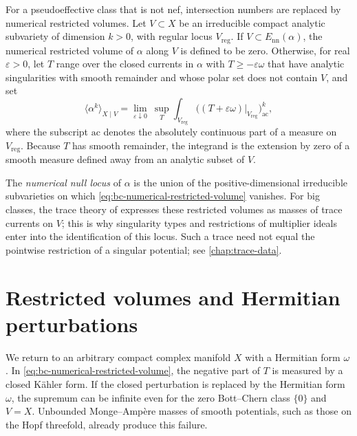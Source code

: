 For a pseudoeffective class that is not nef, intersection numbers are replaced by numerical restricted volumes. Let $V\subset X$ be an irreducible compact analytic subvariety of dimension $k>0$, with regular locus $V_{\mathrm{reg}}$. If $V\subset E_{\mathrm{nn}}(\alpha)$, the numerical restricted volume of $\alpha$ along $V$ is defined to be zero. Otherwise, for real $\varepsilon>0$, let $T$ range over the closed currents in $\alpha$ with $T\geq-\varepsilon\omega$ that have analytic singularities with smooth remainder and whose polar set does not contain $V$, and set
\begin{equation}\label{eq:bc-numerical-restricted-volume}
 \langle\alpha^k\rangle_{X\mid V}
 =\lim_{\varepsilon\downarrow0}\ \sup_T
 \int_{V_{\mathrm{reg}}}
      \bigl((T+\varepsilon\omega)|_{V_{\mathrm{reg}}}\bigr)_{\mathrm{ac}}^k,
\end{equation}
where the subscript $\mathrm{ac}$ denotes the absolutely continuous part of a measure on $V_{\mathrm{reg}}$. Because $T$ has smooth remainder, the integrand is the extension by zero of a smooth measure defined away from an analytic subset of $V$.

The \emph{numerical null locus} of $\alpha$ is the union of the positive-dimensional irreducible subvarieties on which \eqref{eq:bc-numerical-restricted-volume} vanishes. For big classes, the trace theory of \cite[Section~8.3]{SGPT} expresses these restricted volumes as masses of trace currents on $V$; this is why singularity types and restrictions of multiplier ideals enter into the identification of this locus. Such a trace need not equal the pointwise restriction of a singular potential; see \cref{chap:trace-data}.

\section{Restricted volumes and Hermitian perturbations}

We return to an arbitrary compact complex manifold $X$ with a Hermitian form $\omega$. In \eqref{eq:bc-numerical-restricted-volume}, the negative part of $T$ is measured by a closed K\"ahler form. If the closed perturbation is replaced by the Hermitian form $\omega$, the supremum can be infinite even for the zero Bott--Chern class $\{0\}$ and $V=X$. Unbounded Monge--Amp\`ere masses of smooth potentials, such as those on the Hopf threefold, already produce this failure.

